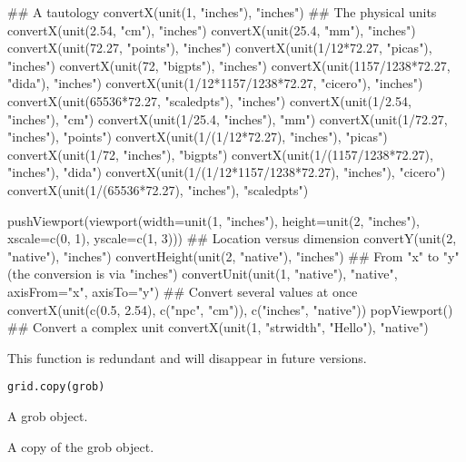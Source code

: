 \begin{Examples}
\begin{ExampleCode}
## A tautology
convertX(unit(1, "inches"), "inches")
## The physical units
convertX(unit(2.54, "cm"), "inches")
convertX(unit(25.4, "mm"), "inches")
convertX(unit(72.27, "points"), "inches")
convertX(unit(1/12*72.27, "picas"), "inches")
convertX(unit(72, "bigpts"), "inches")
convertX(unit(1157/1238*72.27, "dida"), "inches")
convertX(unit(1/12*1157/1238*72.27, "cicero"), "inches")
convertX(unit(65536*72.27, "scaledpts"), "inches")
convertX(unit(1/2.54, "inches"), "cm")
convertX(unit(1/25.4, "inches"), "mm")
convertX(unit(1/72.27, "inches"), "points")
convertX(unit(1/(1/12*72.27), "inches"), "picas")
convertX(unit(1/72, "inches"), "bigpts")
convertX(unit(1/(1157/1238*72.27), "inches"), "dida")
convertX(unit(1/(1/12*1157/1238*72.27), "inches"), "cicero")
convertX(unit(1/(65536*72.27), "inches"), "scaledpts")

pushViewport(viewport(width=unit(1, "inches"),
                       height=unit(2, "inches"),
                       xscale=c(0, 1),
                       yscale=c(1, 3)))
  ## Location versus dimension
  convertY(unit(2, "native"), "inches")
  convertHeight(unit(2, "native"), "inches")
  ## From "x" to "y" (the conversion is via "inches")
  convertUnit(unit(1, "native"), "native",
               axisFrom="x", axisTo="y")
  ## Convert several values at once
  convertX(unit(c(0.5, 2.54), c("npc", "cm")),
                c("inches", "native"))
popViewport()
## Convert a complex unit
convertX(unit(1, "strwidth", "Hello"), "native")
\end{ExampleCode}
\end{Examples}
%
\begin{Description}\relax
This function is redundant and will disappear in future versions.
\end{Description}
%
\begin{Usage}
\begin{verbatim}
grid.copy(grob)
\end{verbatim}
\end{Usage}
%
\begin{Arguments}
\begin{ldescription}
\item[\code{grob}] A grob object.
\end{ldescription}
\end{Arguments}
%
\begin{Value}
A copy of the grob object.
\end{Value}
